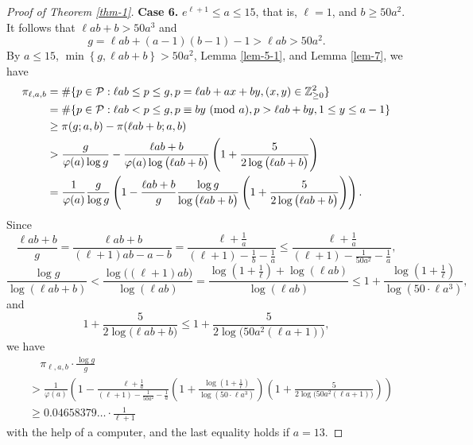 \documentclass[12pt,a4paper,reqno]{amsart}
\numberwithin{equation}{section}
\def\Z{{\mathbb Z}}
\def\pmod #1{\ ({\rm{mod}}\ #1)}
\def\cP{{\mathcal P}}
\theoremstyle{plain}
\theoremstyle{definition}
\begin{document}
\begin{proof}[Proof of Theorem \ref{thm-1}]
	\textbf{Case 6.} $e^{\ell+1}\leq a\leq 15$, that is, $\ell=1$, and $b\geq 50a^{2}$. It follows that $\ell ab+b>50a^{3}$ and
	$$
	g=\ell ab+(a-1)(b-1)-1> \ell ab> 50 a^{2}.
	$$
 By $a\leq 15$, $\min\left\{g, \ell ab+b\right\}>50a^{2}$, Lemma \ref{lem-5-1}, and Lemma \ref{lem-7}, we have
	\begin{align*}
		\pi_{\ell,a,b}&=\#\{p\in\cP :\ell ab\leq p\leq g,p=\ell ab+ax+by,(x,y)\in \Z_{\geq 0}^{2}\}\\
		&= \#\{p\in \mathcal{P}: \ell ab< p\leq g,p\equiv by \pmod{a}, p>\ell ab+by, 1\leq y\leq a-1\}\nonumber\\
		&\geq \pi(g;a,b)-\pi(\ell ab+b;a,b)\\
		&> \frac{g}{\varphi(a)\log g}-\frac{\ell ab+b}{\varphi(a)\log\big(\ell ab+b \big)}\left(1+\frac{5}{2\log\big(\ell ab+b \big)}\right)\\
		&=\frac{1}{\varphi(a)}\frac{g}{\log g}\left(1-\frac{\ell ab+b}{g}\frac{\log g}{\log\big(\ell ab+b \big)} \left(1+\frac{5}{2\log\big(\ell ab+b \big)}\right) \right).
	\end{align*}
	Since 
	\begin{equation*}
		\frac{\ell ab+b}{g}=\frac{\ell ab+b}{(\ell+1)ab-a-b}
		=\frac{\ell+\frac{1}{a}}{(\ell+1)-\frac{1}{b}-\frac{1}{a}}
		\leq \frac{\ell+\frac{1}{a}}{(\ell+1)-\frac{1}{50a^{2}}-\frac{1}{a}},
	\end{equation*}
	\begin{equation*}
		\frac{\log g}{\log(\ell ab+b)}
		< \frac{\log \big( (\ell+1)ab \big)}{\log(\ell ab)}
		=\frac{\log(1+\frac{1}{\ell})+\log (\ell ab)}{\log (\ell ab)}
		\leq 1+\frac{\log(1+\frac{1}{\ell})}{\log (50 \cdot \ell a^{3})},
	\end{equation*}
	and
	\begin{equation*}
		1+\frac{5}{2\log\big(\ell ab+b\big)}\leq 1+\frac{5}{2\log\big(50a^{2}(\ell a+1)\big)},
	\end{equation*}
	we have
	\begin{align*}
		&\quad \pi_{\ell,a,b}\cdot\frac{\log g}{g}\\
		&>\frac{1}{\varphi(a)}
		\left(1-\frac{\ell+\frac{1}{a}}{(\ell+1)-\frac{1}{50a^{2}}-\frac{1}{a}}
		\left(1+\frac{\log(1+\frac{1}{\ell})}{\log (50 \cdot \ell a^{3})} \right) 
		\left(1+\frac{5}{2\log\big(50a^{2}(\ell a+1) \big)}\right) \right)\\
		&\geq 0.04658379 \ldots \cdot \frac{1}{\ell+1}
	\end{align*}
	with the help of a computer, and the last equality holds if $a=13$.
	

\end{proof}
\end{document}
